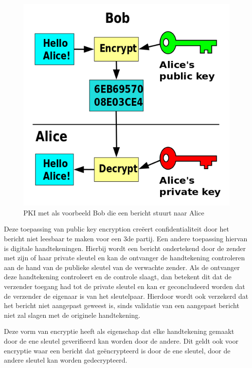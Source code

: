 \begin{figure}[H]
	\includegraphics{img/pki-alice-and-bob}
	\centering
	\caption{\gls{PKI} met als voorbeeld Bob die een bericht stuurt naar Alice}
	\label{fig:pki-alice-and-bob}
\end{figure}

Deze toepassing van public key encryption creëert confidentialiteit door het
bericht niet leesbaar te maken voor een 3de partij. Een andere toepassing
hiervan is digitale handtekeningen. Hierbij wordt een bericht ondertekend door
de zender met zijn of haar private sleutel en kan de ontvanger de handtekening
controleren aan de hand van de
publieke sleutel van de verwachte zender. Als de ontvanger deze handtekening
controleert en de controle slaagt, dan betekent dit dat de verzender toegang had
tot de private sleutel en kan er geconcludeerd worden dat de verzender de
eigenaar is van het sleutelpaar. Hierdoor wordt ook verzekerd dat het
bericht niet aangepast geweest is, sinds validatie van een aangepast bericht
niet zal slagen met de originele handtekening.

Deze vorm van encryptie heeft als eigenschap dat elke handtekening gemaakt door
de ene sleutel geverifieerd kan worden door de andere. Dit geldt ook voor
encryptie waar een bericht dat geëncrypteerd is door de ene sleutel, door de
andere sleutel kan worden gedecrypteerd.

